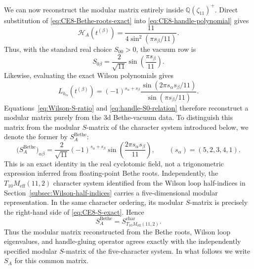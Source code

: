 \documentclass[11pt,a4paper]{article}
\numberwithin{equation}{section}
\begin{document}
We can now reconstruct the modular matrix entirely inside $\mathbb Q(\zeta_{11})^+$.  Direct substitution of \eqref{eq:CE8-Bethe-roots-exact} into \eqref{eq:CE8-handle-polynomial} gives
\begin{equation}
  \mathcal H_A\!\left(t^{(\beta)}\right)
  =\frac{11}{4\sin^2(\pi s_\beta/11)}.
  \label{eq:CE8-handle-cyclotomic}
\end{equation}
Thus, with the standard real choice $S_{00}>0$, the vacuum row is
\begin{equation}
  S_{0\beta}
  =\frac{2}{\sqrt{11}}
  \sin\!\left(\frac{\pi s_\beta}{11}\right).
  \label{eq:CE8-S0-exact}
\end{equation}
Likewise, evaluating the exact Wilson polynomials gives
\begin{equation}
  L_{h_\alpha}\!\left(t^{(\beta)}\right)
  =(-1)^{s_\alpha+s_\beta}
  \frac{
  \sin\!\left(2\pi s_\alpha s_\beta/11\right)
  }{
  \sin\!\left(\pi s_\beta/11\right)
  }.
  \label{eq:CE8-Wilson-cyclotomic}
\end{equation}
Equations~\eqref{eq:Wilson-S-ratio} and \eqref{eq:handle-S0-relation} therefore reconstruct a modular matrix purely from the 3d Bethe-vacuum data.  To distinguish this matrix from the modular $S$-matrix of the character system introduced below, we denote the former by $S_A^{\mathrm{Bethe}}$:
\begin{equation}
  \bigl(S_A^{\mathrm{Bethe}}\bigr)_{\alpha\beta}
  =\frac{2}{\sqrt{11}}
  (-1)^{s_\alpha+s_\beta}
  \sin\!\left(\frac{2\pi s_\alpha s_\beta}{11}\right),
  \qquad
  (s_\alpha)=(5,2,3,4,1).
  \label{eq:CE8-S-exact}
\end{equation}
This is an exact identity in the real cyclotomic field, not a trigonometric expression inferred from floating-point Bethe roots.  Independently, the $T_{10}M_{\mathrm{eff}}(11,2)$ character system identified from the Wilson loop half-indices in Section~\ref{subsec:Wilson-half-indices} carries a five-dimensional modular representation.  In the same character ordering, its modular $S$-matrix is precisely the right-hand side of \eqref{eq:CE8-S-exact}.  Hence
\begin{equation}
  S_A^{\mathrm{Bethe}}
  =S_{T_{10}M_{\mathrm{eff}}(11,2)}^{\mathrm{char}}.
  \label{eq:CE8-Bethe-character-S-equality}
\end{equation}
Thus the modular matrix reconstructed from the Bethe roots, Wilson loop eigenvalues, and handle-gluing operator agrees exactly with the independently specified modular $S$-matrix of the five-character system.  In what follows we write $S_A$ for this common matrix.
\end{document}
